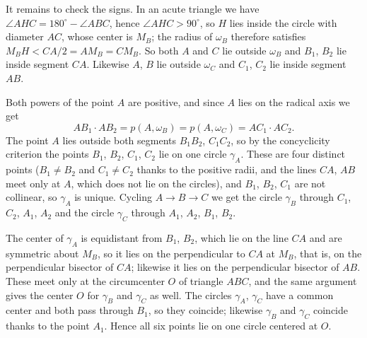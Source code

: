 {    It remains to check the signs. In an acute triangle we have $\angle AHC = 180^\circ - \angle ABC$, hence $\angle AHC > 90^\circ$, so $H$ lies inside the circle with diameter $AC$, whose center is $M_B$; the radius of $\omega_B$ therefore satisfies $M_BH < CA/2 = AM_B = CM_B$. So both $A$ and $C$ lie outside $\omega_B$ and $B_1$, $B_2$ lie inside segment $CA$. Likewise $A$, $B$ lie outside $\omega_C$ and $C_1$, $C_2$ lie inside segment $AB$.

    Both powers of the point $A$ are positive, and since $A$ lies on the radical axis we get
    $$
    AB_1 \cdot AB_2 = p(A,\omega_B) = p(A,\omega_C) = AC_1 \cdot AC_2.
    $$
    The point $A$ lies outside both segments $B_1B_2$, $C_1C_2$, so by the concyclicity criterion the points $B_1$, $B_2$, $C_1$, $C_2$ lie on one circle $\gamma_A$. These are four distinct points ($B_1 \neq B_2$ and $C_1 \neq C_2$ thanks to the positive radii, and the lines $CA$, $AB$ meet only at $A$, which does not lie on the circles), and $B_1$, $B_2$, $C_1$ are not collinear, so $\gamma_A$ is unique. Cycling $A \to B \to C$ we get the circle $\gamma_B$ through $C_1$, $C_2$, $A_1$, $A_2$ and the circle $\gamma_C$ through $A_1$, $A_2$, $B_1$, $B_2$.

    The center of $\gamma_A$ is equidistant from $B_1$, $B_2$, which lie on the line $CA$ and are symmetric about $M_B$, so it lies on the perpendicular to $CA$ at $M_B$, that is, on the perpendicular bisector of $CA$; likewise it lies on the perpendicular bisector of $AB$. These meet only at the circumcenter $O$ of triangle $ABC$, and the same argument gives the center $O$ for $\gamma_B$ and $\gamma_C$ as well. The circles $\gamma_A$, $\gamma_C$ have a common center and both pass through $B_1$, so they coincide; likewise $\gamma_B$ and $\gamma_C$ coincide thanks to the point $A_1$. Hence all six points lie on one circle centered at $O$.
}

